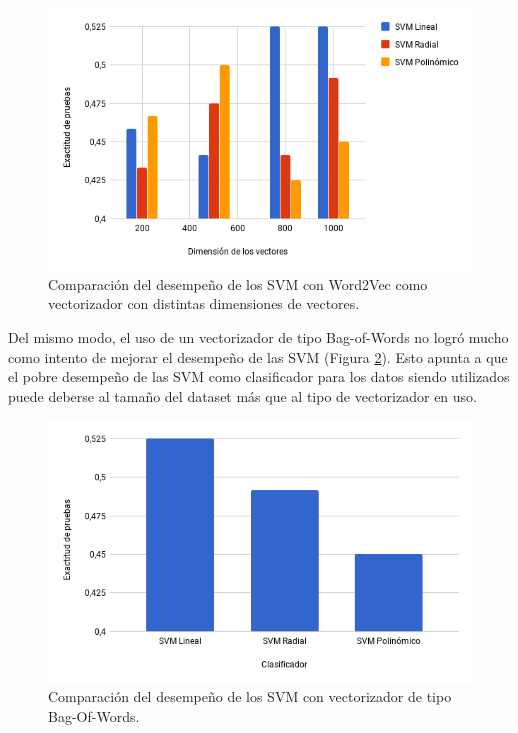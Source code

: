 \documentclass[conference]{IEEEtran}
\begin{document}
        \begin{figure}[htbp]
            \centerline{\includegraphics[width=\linewidth]{figuras/acc_svm_w2v.png}}
            \caption{Comparación del desempeño de los SVM con Word2Vec como vectorizador con distintas dimensiones de vectores.}
            \label{fig:acc_svm_w2v}
        \end{figure}
    
        Del mismo modo, el uso de un vectorizador de tipo Bag-of-Words no logró mucho como intento de mejorar el desempeño de las SVM (Figura \ref{fig:acc_svm_cv}). Esto apunta a que el pobre desempeño de las SVM como clasificador para los datos siendo utilizados puede deberse al tamaño del dataset más que al tipo de vectorizador en uso.
        
        \begin{figure}[htbp]
            \centerline{\includegraphics[width=\linewidth]{figuras/acc_svm_cv.png}}
            \caption{Comparación del desempeño de los SVM con vectorizador de tipo Bag-Of-Words.}
            \label{fig:acc_svm_cv}
        \end{figure}
    
\end{document}

